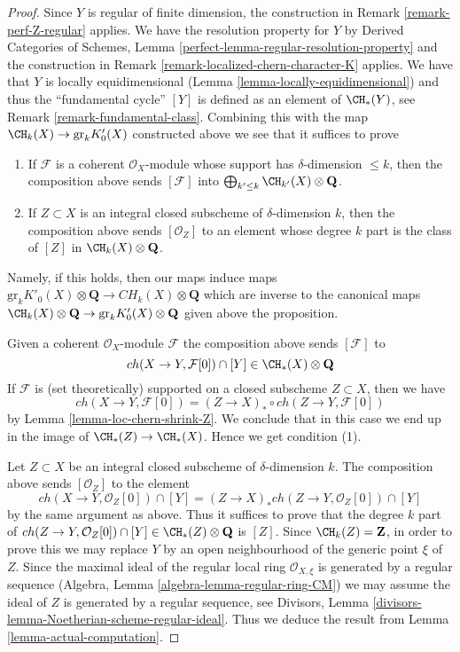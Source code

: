 \begin{proof}
Since $Y$ is regular of finite dimension, the construction in
Remark \ref{remark-perf-Z-regular} applies.
We have the resolution property for $Y$ by
Derived Categories of Schemes, Lemma
\ref{perfect-lemma-regular-resolution-property}
and the construction in Remark \ref{remark-localized-chern-character-K}
applies. We have that $Y$ is locally equidimensional
(Lemma \ref{lemma-locally-equidimensional}) and
thus the ``fundamental cycle'' $[Y]$ is defined
as an element of $\CH_*(Y)$, see Remark \ref{remark-fundamental-class}.
Combining this with the map $\CH_k(X) \to \text{gr}_kK'_0(X)$
constructed above we see that it suffices to prove
\begin{enumerate}
\item If $\mathcal{F}$ is a coherent $\mathcal{O}_X$-module
whose support has $\delta$-dimension $\leq k$, then
the composition above sends $[\mathcal{F}]$ into
$\bigoplus_{k' \leq k} \CH_{k'}(X) \otimes \mathbf{Q}$.
\item If $Z \subset X$ is an integral closed subscheme
of $\delta$-dimension $k$, then the composition above
sends $[\mathcal{O}_Z]$ to an element whose degree $k$
part is the class of $[Z]$ in $\CH_k(X) \otimes \mathbf{Q}$.
\end{enumerate}
Namely, if this holds, then our maps induce maps
$\text{gr}_kK'_0(X) \otimes \mathbf{Q} \to CH_k(X) \otimes \mathbf{Q}$
which are inverse to the canonical maps 
$\CH_k(X) \otimes \mathbf{Q} \to \text{gr}_k K'_0(X) \otimes \mathbf{Q}$
given above the proposition.

\medskip\noindent
Given a coherent $\mathcal{O}_X$-module $\mathcal{F}$
the composition above sends $[\mathcal{F}]$ to
$$
ch(X \to Y, \mathcal{F}[0]) \cap [Y] \in \CH_*(X) \otimes \mathbf{Q}
$$
If $\mathcal{F}$ is (set theoretically) supported on a closed subscheme
$Z \subset X$, then we have
$$
ch(X \to Y, \mathcal{F}[0]) = (Z \to X)_* \circ ch(Z \to Y, \mathcal{F}[0])
$$
by Lemma \ref{lemma-loc-chern-shrink-Z}. We conclude that in this
case we end up in the image of $\CH_*(Z) \to \CH_*(X)$. Hence
we get condition (1).

\medskip\noindent
Let $Z \subset X$ be an integral closed subscheme of $\delta$-dimension $k$.
The composition above sends $[\mathcal{O}_Z]$ to the element
$$
ch(X \to Y, \mathcal{O}_Z[0]) \cap [Y] =
(Z \to X)_* ch(Z \to Y, \mathcal{O}_Z[0]) \cap [Y]
$$
by the same argument as above.
Thus it suffices to prove that the degree $k$ part of
$ch(Z \to Y, \mathcal{O}_Z[0]) \cap [Y] \in
\CH_*(Z) \otimes \mathbf{Q}$ is $[Z]$.
Since $\CH_k(Z) = \mathbf{Z}$, in order
to prove this we may replace $Y$ by an open neighbourhood of the
generic point $\xi$ of $Z$. Since the maximal ideal of the regular
local ring $\mathcal{O}_{X, \xi}$ is generated by a
regular sequence (Algebra, Lemma \ref{algebra-lemma-regular-ring-CM})
we may assume the ideal of $Z$ is generated by a regular sequence, see
Divisors, Lemma \ref{divisors-lemma-Noetherian-scheme-regular-ideal}.
Thus we deduce the result from Lemma \ref{lemma-actual-computation}.
\end{proof}







